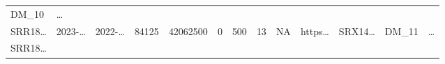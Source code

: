 \documentclass[
]{article}
\begin{document}
\begin{longtable}[]{@{}lllllllllllll@{}}
\begin{minipage}[t]{0.08\columnwidth}
DM\_10\strut
\end{minipage} & \begin{minipage}[t]{0.02\columnwidth}\raggedright
\ldots{}\strut
\end{minipage}\tabularnewline
\begin{minipage}[t]{0.05\columnwidth}\raggedright
SRR18\ldots{}\strut
\end{minipage} & \begin{minipage}[t]{0.05\columnwidth}\raggedright
2023-\ldots{}\strut
\end{minipage} & \begin{minipage}[t]{0.05\columnwidth}\raggedright
2022-\ldots{}\strut
\end{minipage} & \begin{minipage}[t]{0.04\columnwidth}\raggedright
84125\strut
\end{minipage} & \begin{minipage}[t]{0.05\columnwidth}\raggedright
42062500\strut
\end{minipage} & \begin{minipage}[t]{0.05\columnwidth}\raggedright
0\strut
\end{minipage} & \begin{minipage}[t]{0.05\columnwidth}\raggedright
500\strut
\end{minipage} & \begin{minipage}[t]{0.05\columnwidth}\raggedright
13\strut
\end{minipage} & \begin{minipage}[t]{0.05\columnwidth}\raggedright
NA\strut
\end{minipage} & \begin{minipage}[t]{0.05\columnwidth}\raggedright
https\ldots{}\strut
\end{minipage} & \begin{minipage}[t]{0.05\columnwidth}\raggedright
SRX14\ldots{}\strut
\end{minipage} & \begin{minipage}[t]{0.08\columnwidth}\raggedright
DM\_11\strut
\end{minipage} & \begin{minipage}[t]{0.02\columnwidth}\raggedright
\ldots{}\strut
\end{minipage}\tabularnewline
\begin{minipage}[t]{0.05\columnwidth}\raggedright
SRR18\ldots{}\strut
\end{minipage} & \begin{minipage}[t]{0.05\columnwidth}\raggedright

\end{minipage}
\end{longtable}
\end{document}
